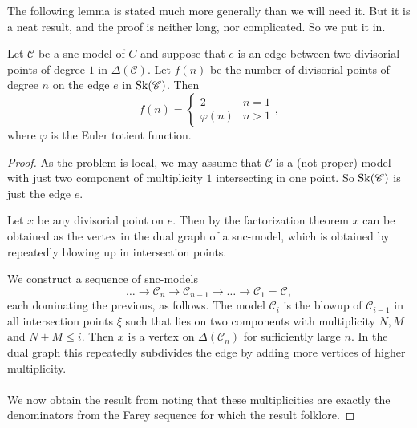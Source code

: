 The following lemma is stated much more generally than we will need it. 
But it is a neat result, and the proof is neither long, nor complicated. So we put it in. 
\begin{lemma}\label{lem:number_divisorial_points}
	Let $\mathscr C$ be a snc-model of  $C$ and suppose that $e$ is an edge between two divisorial points of degree $1$ in $\Delta(\mathscr C)$. 
	Let $f(n)$ be the number of divisorial points of degree $n$ on the edge  $e$ in $\operatorname{Sk}(\mathscr C)$. 
	Then \[
		f(n) = \begin{cases}
			2 & n = 1 \\
			\varphi(n) & n > 1
		\end{cases}
	,\] 
	where $\varphi$ is the Euler totient function. 
\end{lemma}
\begin{proof}
	As the problem is local, we may assume that $\mathscr C$ is a (not proper) model with just two component of multiplicity $1$ intersecting in one point. 
	So $\operatorname{Sk}(\mathscr C)$ is just the edge $e$. 

	Let $x$ be any divisorial point on $e$. 
	Then by the factorization theorem $x$ can be obtained as the vertex in the dual graph of a snc-model, which is obtained by repeatedly blowing up in intersection points. 

	We construct a sequence of snc-models \[
	\ldots \to 	\mathscr C_n \to \mathscr C_{n -1} \to \ldots \to \mathscr C_1 = \mathscr C
,\]
each dominating the previous, as follows. 
The model  $\mathscr C_i$ is the blowup of $\mathscr C_{i-1}$ in all intersection points $\xi$ such that lies on two components with multiplicity $N, M$ and $N + M \le i$. 
Then $x$ is a vertex on $\Delta(\mathscr C_n)$ for sufficiently large $n$.
In the dual graph this repeatedly subdivides the edge by adding more vertices of higher multiplicity. 
\\
\noindent{}
\\
We now obtain the result from noting that these multiplicities are exactly the denominators from the Farey sequence for which the result folklore. 
\end{proof}


